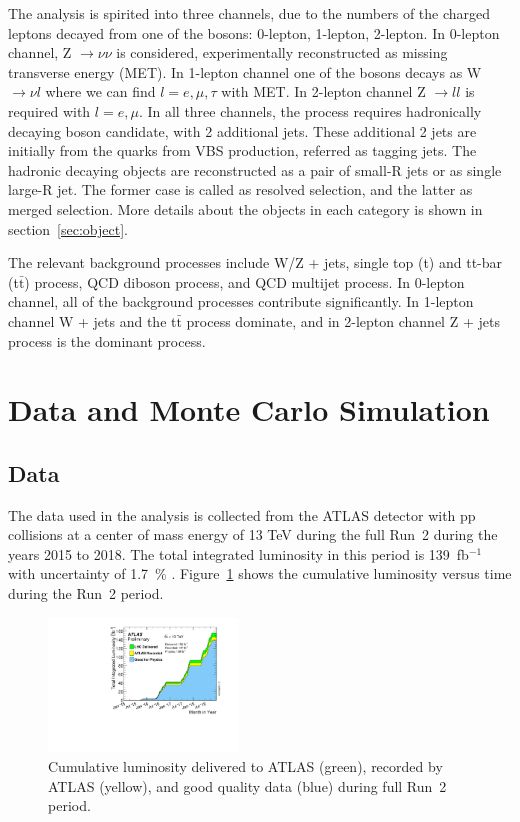 The analysis is spirited into three channels, due to the numbers of the charged leptons decayed from one of the bosons: 0-lepton, 1-lepton, 2-lepton. 
In 0-lepton channel, Z $\rightarrow \nu \nu$ is considered, experimentally reconstructed as missing transverse energy (MET). In 1-lepton channel one of the bosons decays as W $\rightarrow \nu l$ where we can find $l = e, \mu, \tau$ with MET. In 2-lepton channel Z $\rightarrow l l$ is required with $l = e, \mu$. 
In all three channels, the process requires hadronically decaying boson candidate, with 2 additional jets. These additional 2 jets are initially from the quarks from VBS production, referred as tagging jets. The hadronic decaying objects are reconstructed as a pair of small-R jets or as single large-R jet. The former case is called as resolved selection, and the latter as merged selection. More details about the objects in each category is shown in section~\ref{sec:object}.

The relevant background processes include W/Z + jets, single top (t) and tt-bar (t$\bar{\mathrm{t}}$) process, QCD diboson process, and QCD multijet process.
In 0-lepton channel, all of the background processes contribute significantly. In 1-lepton channel W + jets and the t$\bar{\mathrm{t}}$ process dominate, and in 2-lepton channel Z + jets process is the dominant process.

\section{Data and Monte Carlo Simulation}
\subsection{Data}
The data used in the analysis is collected from the ATLAS detector with pp collisions at a center of mass energy of 13 TeV during the full Run~2 during the years 2015 to 2018. The total integrated luminosity in this period is 139~fb$^{-1}$ with uncertainty of 1.7~\% \cite{DAPR-2010-01}. Figure~\ref{fig:luminosity} shows the cumulative luminosity versus time during the Run~2 period.

\begin{figure}[H]
\begin{center}
 \includegraphics[width=0.45\textwidth,keepaspectratio]{figures/intlumivstimeRun2DQall.pdf}
\caption[f]{
Cumulative luminosity delivered to ATLAS (green), recorded by ATLAS (yellow), and good quality data (blue) during full Run~2 period.
}
\label{fig:luminosity}
\end{center}
\end{figure}

